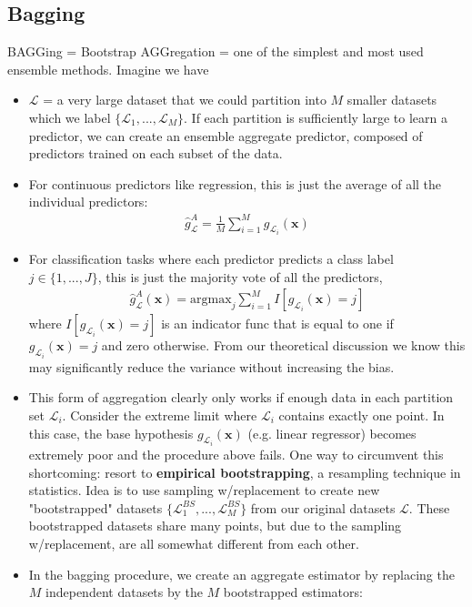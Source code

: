 \documentclass[norsk,a4paper,11pt]{article}
\begin{document}
\subsection{Bagging}
BAGGing = Bootstrap AGGregation = one of the simplest and most used ensemble methods.
Imagine we have
\begin{itemize}
	\item $\mathcal{L}$ = a very large dataset that we could partition into $M$ smaller datasets which we label $\{\mathcal{L}_1, ..., \mathcal{L}_M \}$. If each partition is sufficiently large to learn a predictor, we can create an ensemble aggregate predictor, composed of predictors trained on each subset of the data.
	\item For continuous predictors like regression, this is just the average of all the individual predictors:
	\begin{align}
		\hat{g}_\mathcal{L}^A = \frac{1}{M} \sum_{i=1}^M g_{\mathcal{L}_i} (\bm{x})
	\end{align}
	\item For classification tasks where each predictor predicts a class label $j \in \{ 1, ..., J \}$, this is just the majority vote of all the predictors,
	\begin{align}
		\hat{g}_\mathcal{L}^A (\bm{x}) = \text{argmax}_j \sum_{i=1}^M I[g_{\mathcal{L}_i} (\bm{x}) = j]
	\end{align}
	where $I[g_{\mathcal{L}_i} (\bm{x}) = j]$ is an indicator func that is equal to one if $g_{\mathcal{L}_i} (\bm{x}) = j$ and zero otherwise. From our theoretical discussion we know this may significantly reduce the variance without increasing the bias.
	\item This form of aggregation clearly only works if enough data in each partition set $\mathcal{L}_i$. Consider the extreme limit where $\mathcal{L}_i$ contains exactly one point. In this case, the base hypothesis $g_{\mathcal{L}_i} (\bm{x})$ (e.g. linear regressor) becomes extremely poor and the procedure above fails. One way to circumvent this shortcoming: resort to \textbf{empirical bootstrapping}, a resampling technique in statistics. Idea is to use sampling w/replacement to create new "bootstrapped" datasets $\{\mathcal{L}_1^{BS}, ..., \mathcal{L}_M^{BS} \}$ from our original datasets $\mathcal{L}$. These bootstrapped datasets share many points, but due to the sampling w/replacement, are all somewhat different from each other.
	\item In the bagging procedure, we create an aggregate estimator by replacing the $M$ independent datasets by the $M$ bootstrapped estimators:

\end{itemize}
\end{document}
